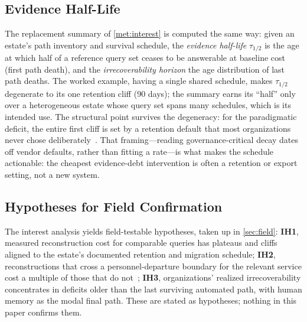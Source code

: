 \subsection{Evidence Half-Life}
\label{sec:interest-halflife}

The replacement summary of \cref{met:interest} is computed the same way: given an
estate's path inventory and survival schedule, the \emph{evidence half-life}
$\tau_{1/2}$ is the age at which half of a reference query set ceases to be
answerable at baseline cost (first path death), and the \emph{irrecoverability
horizon} the age distribution of last path deaths. The worked example, having a
single shared schedule, makes $\tau_{1/2}$ degenerate to its one retention cliff
(90 days); the summary earns its ``half'' only over a heterogeneous estate whose
query set spans many schedules, which is its intended use. The structural point
survives the degeneracy: for the paradigmatic deficit, the entire first cliff is
set by a retention default that most organizations never chose
deliberately~\cite{nist80092}. That framing---reading governance-critical decay
dates off vendor defaults, rather than fitting a rate---is what makes the
schedule actionable: the cheapest evidence-debt intervention is often a retention
or export setting, not a new system.

\subsection{Hypotheses for Field Confirmation}
\label{sec:interest-hyps}

The interest analysis yields field-testable hypotheses, taken up in
\cref{sec:field}: \textbf{IH1}, measured reconstruction cost for comparable
queries has plateaus and cliffs aligned to the estate's
documented retention and migration schedule; \textbf{IH2}, reconstructions that
cross a personnel-departure boundary for the relevant service cost a multiple of
those that do not~\cite{rigby2016}; \textbf{IH3}, organizations' realized
irrecoverability concentrates in deficits older than the last surviving automated
path, with human memory as the modal final path. These are stated as hypotheses;
nothing in this paper confirms them.
